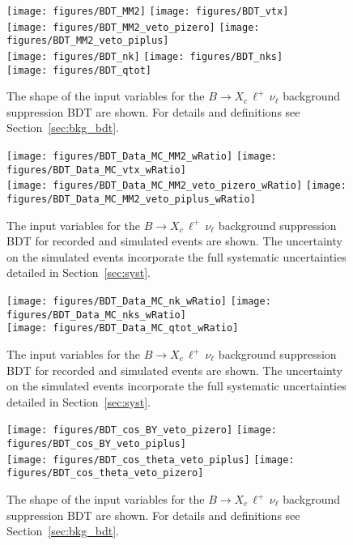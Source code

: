 \documentclass[twocolumn,aps,prd,superscriptaddress,nofootinbib,floatfix,preprintnumbers,a4]{revtex4-1}
\newcommand{\bclnu}{\ensuremath{B \to X_c \, \ell^+\, \nu_{\ell}}\xspace}
\begin{document}
\begin{appendix}
\begin{figure}[h!]
  \texttt{[image: figures/BDT\_MM2]} 
  \texttt{[image: figures/BDT\_vtx]}  \\
  \texttt{[image: figures/BDT\_MM2\_veto\_pizero]}  
  \texttt{[image: figures/BDT\_MM2\_veto\_piplus]} \\
  \texttt{[image: figures/BDT\_nk]} 
  \texttt{[image: figures/BDT\_nks]}  \\
  \texttt{[image: figures/BDT\_qtot]}   
\caption{
  The shape of the input variables for the \bclnu background suppression BDT are shown. For details and definitions see Section~\ref{sec:bkg_bdt}.
 }
\label{fig:bdtvars}
\end{figure}  

\begin{figure}[h!]
  \texttt{[image: figures/BDT\_Data\_MC\_MM2\_wRatio]} 
  \texttt{[image: figures/BDT\_Data\_MC\_vtx\_wRatio]}  \\
  \texttt{[image: figures/BDT\_Data\_MC\_MM2\_veto\_pizero\_wRatio]}  
  \texttt{[image: figures/BDT\_Data\_MC\_MM2\_veto\_piplus\_wRatio]} \\
\caption{
  The input variables for the \bclnu background suppression BDT for recorded and simulated events are shown. The uncertainty on the simulated events incorporate the full systematic uncertainties detailed in Section~\ref{sec:syst}.
 }
\label{fig:bdtvars_dataMC}
\end{figure}  

\begin{figure}[h!]
  \texttt{[image: figures/BDT\_Data\_MC\_nk\_wRatio]} 
  \texttt{[image: figures/BDT\_Data\_MC\_nks\_wRatio]}  \\
  \texttt{[image: figures/BDT\_Data\_MC\_qtot\_wRatio]}   
\caption{
  The input variables for the \bclnu background suppression BDT for recorded and simulated events are shown. The uncertainty on the simulated events incorporate the full systematic uncertainties detailed in Section~\ref{sec:syst}.
 }
\label{fig:bdtvars_dataMC2}
\end{figure}  

\begin{figure}[h!]
  \texttt{[image: figures/BDT\_cos\_BY\_veto\_pizero]} 
  \texttt{[image: figures/BDT\_cos\_BY\_veto\_piplus]}  \\
  \texttt{[image: figures/BDT\_cos\_theta\_veto\_piplus]}  
  \texttt{[image: figures/BDT\_cos\_theta\_veto\_pizero]} \\
\caption{
  The shape of the input variables for the \bclnu background suppression BDT are shown. For details and definitions see Section~\ref{sec:bkg_bdt}.
 }
\label{fig:bdtvars2}
\end{figure}  


\end{appendix}
\end{document}
